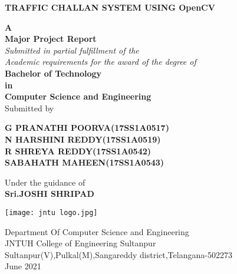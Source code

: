 \documentclass[12pt,a4paper]{report}
\begin{document}
\begin{titlepage}
\begin{center}
\begin{large}
\textbf{\LARGE TRAFFIC CHALLAN SYSTEM USING OpenCV }\\[.85cm]
\end{large}
\textbf{\large A}\\[.35cm]
\textbf{ \large Major Project Report}\\[.35cm]
\textit{\large Submitted in partial fulfillment of the \\ Academic requirements for the award of the degree of}\\[.6cm]
\textbf{\large  {Bachelor of Technology\\[.1cm] in}}\\[.1cm]
\textbf{\large {Computer Science and Engineering }}\\[.25cm]
\textup{\large Submitted by}\\[.25cm]
\begin{center}
\textbf{\large G PRANATHI POORVA\hspace{0.4in}(17SS1A0517)}\\
\textbf{\large N HARSHINI REDDY\hspace{0.6in}(17SS1A0519)}\\
\textbf{\large R SHREYA REDDY\hspace{0.8in}(17SS1A0542)}\\
\textbf{\large SABAHATH MAHEEN\hspace{0.5in}(17SS1A0543)}\\
\vspace{0.2 cm}
\end{center}
\vspace{0.3cm}
\textup{{\large Under the guidance of}}\\
\textbf{{\large Sri.JOSHI SHRIPAD}}\\
\begin{center}
  \texttt{[image: jntu logo.jpg]}
\end{center}
\textup {\large{Department Of Computer Science and Engineering}}\\
\normalsize
\textup {{JNTUH College of Engineering Sultanpur}}\\
\vspace{0.01cm}
\textup{\footnotesize {Sultanpur(V),Pulkal(M),Sangareddy district,Telangana-502273 }}\\[.35cm]
\textup{\small{June 2021}}
\end{center}
\end{titlepage}
\end{document}
